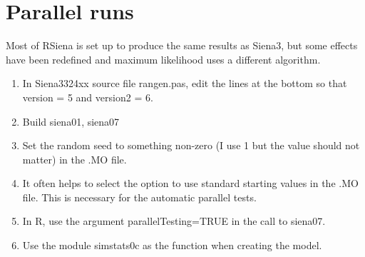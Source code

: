 \documentclass[12pt, a4paper]{article}
\renewcommand{\=}{\,=\,}
\newcommand{\+}{\,+\,}
\begin{document}
\section{Parallel runs}
Most of RSiena is set up to produce the same results as Siena3, but some effects
have been redefined and maximum likelihood uses a different algorithm.
\begin{enumerate}
\item In Siena3324xx source file \textsf{rangen.pas}, edit the lines at the
  bottom so that \textsf{version = 5} and \textsf{version2 = 6}.
\item Build siena01, siena07
\item Set the random seed to something non-zero (I use 1 but the value
  should not matter) in the .MO file.
\item It often helps to select the option to use standard starting values in the
  .MO file. This is necessary for the automatic parallel tests.
\item In R, use the argument \textsf{parallelTesting=TRUE} in the call to
  \textsf{siena07}.
\item Use the module \textsf{simstats0c} as the function when creating the
  model.
\end{enumerate}
\end{document}
